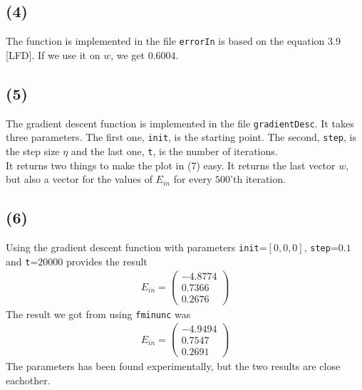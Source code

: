 \documentclass[a4paper]{article}
\begin{document}
\subsection*{(4)}
The function is implemented in the file \texttt{errorIn} is based on the equation 3.9 [LFD]. If we use it on $w$, we get $0.6004$.

\subsection*{(5)}
The gradient descent function is implemented in the file \texttt{gradientDesc}. It takes three parameters. The first one, \texttt{init}, is the starting point. The second, \texttt{step}, is the step size $\eta$ and the last one, \texttt{t}, is the number of iterations.\\
It returns two things to make the plot in (7) easy. It returns the last vector $w$, but also a vector for the values of $E_{in}$ for every $500$'th iteration.


\subsection*{(6)}
Using the gradient descent function with parameters \texttt{init}=$[0, 0, 0]$, \texttt{step}=$0.1$ and \texttt{t}=$20000$ provides the result 
\begin{align*}
E_{in}=
\begin{pmatrix}
-4.8774 \\
0.7366 \\
0.2676
\end{pmatrix}
\end{align*}
The result we got from using \texttt{fminunc} was
\begin{align*}
E_{in}=
\begin{pmatrix}
-4.9494 \\
0.7547 \\
0.2691
\end{pmatrix}
\end{align*}
The parameters has been found experimentally, but the two results are close eachother.
\end{document}
